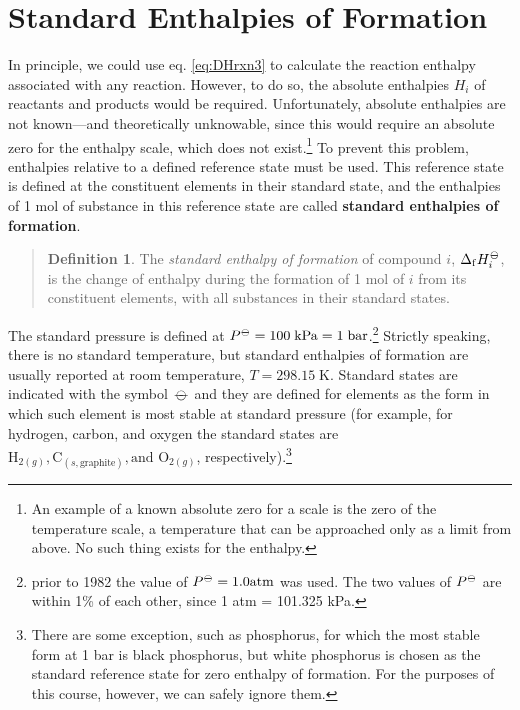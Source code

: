 \documentclass[
  9pt,
]{extbook}
\theoremstyle{definition}
\newtheorem{definition}{Definition}[chapter]
\theoremstyle{definition}
\theoremstyle{definition}
\theoremstyle{definition}
\theoremstyle{remark}
\begin{document}
\section{Standard Enthalpies of Formation}\label{formenthalpy}

In principle, we could use eq. \eqref{eq:DHrxn3} to calculate the reaction enthalpy associated with any reaction. However, to do so, the absolute enthalpies \(H_i\) of reactants and products would be required. Unfortunately, absolute enthalpies are not known---and theoretically unknowable, since this would require an absolute zero for the enthalpy scale, which does not exist.\footnote{An example of a known absolute zero for a scale is the zero of the temperature scale, a temperature that can be approached only as a limit from above. No such thing exists for the enthalpy.} To prevent this problem, enthalpies relative to a deﬁned reference state must be used. This reference state is defined at the constituent elements in their standard state, and the enthalpies of 1 mol of substance in this reference state are called \textbf{standard enthalpies of formation}.

\begin{quote}
\begin{definition}
\protect\hypertarget{def:stdenthapies}{}\label{def:stdenthapies}The \emph{standard enthalpy of formation} of compound \(i\), \(\Delta_{\mathrm{f}} H_i^{-\kern-6pt{\ominus}\kern-6pt-}\), is the change of enthalpy during the formation of 1 mol of \(i\) from its constituent elements, with all substances in their standard states.
\end{definition}
\end{quote}

The standard pressure is defined at \(P^{{-\kern-6pt{\ominus}\kern-6pt-}} = 100 \; \mathrm{kPa} = 1 \; \mathrm{bar}\).\footnote{prior to 1982 the value of \(P^{{-\kern-6pt{\ominus}\kern-6pt-}} = 1.0 \mathrm{ atm}\) was used. The two values of \(P^{-\kern-6pt{\ominus}\kern-6pt-}\) are within 1\% of each other, since 1 atm = 101.325 kPa.} Strictly speaking, there is no standard temperature, but standard enthalpies of formation are usually reported at room temperature, \(T = 298.15 \; \mathrm{K}\). Standard states are indicated with the symbol \({-\kern-6pt{\ominus}\kern-6pt-}\) and they are defined for elements as the form in which such element is most stable at standard pressure (for example, for hydrogen, carbon, and oxygen the standard states are \(\mathrm{H}_{2(g)}, \mathrm{C}_{(s,\text{graphite})}, \text{and }\mathrm{O}_{2(g)}\), respectively).\footnote{There are some exception, such as phosphorus, for which the most stable form at 1 bar is black phosphorus, but white phosphorus is chosen as the standard reference state for zero enthalpy of formation. For the purposes of this course, however, we can safely ignore them.}
\end{document}

